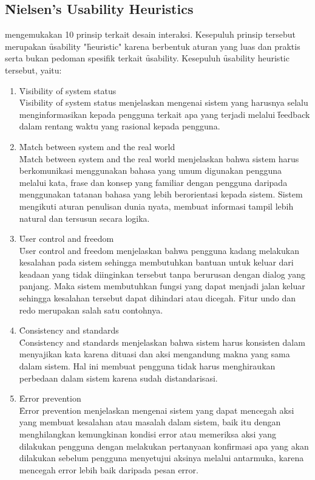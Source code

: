 \subsection{\f{Nielsen's Usability Heuristics}}\label{subsec:nush}
\citet{article.nielsen} mengemukakan 10 prinsip terkait desain interaksi. Kesepuluh prinsip tersebut merupakan \f{usability} "\f{heuristic}" karena berbentuk aturan yang luas dan praktis serta bukan pedoman spesifik terkait \f{usability}. Kesepuluh \f{usability} heuristic tersebut, yaitu:
\begin{enumerate}
	\item \f{Visibility of system status}\\
	\f{Visibility of system status} menjelaskan mengenai sistem yang harusnya selalu menginformasikan kepada pengguna terkait apa yang terjadi melalui \f{feedback} dalam rentang waktu yang rasional kepada pengguna.
	\item \f{Match between system and the real world}\\
	\f{Match between system and the real world} menjelaskan bahwa sistem harus berkomunikasi menggunakan bahasa yang umum digunakan pengguna melalui kata, frase dan konsep yang familiar dengan pengguna daripada menggunakan tatanan bahasa yang lebih berorientasi kepada sistem. Sistem mengikuti aturan penulisan dunia nyata, membuat informasi tampil lebih natural dan tersusun secara logika.
	\item \f{User control and freedom}\\
	\f{User control and freedom} menjelaskan bahwa pengguna kadang melakukan kesalahan pada sistem sehingga membutuhkan bantuan untuk keluar dari keadaan yang tidak diinginkan tersebut tanpa berurusan dengan dialog yang panjang. Maka sistem membutuhkan fungsi yang dapat menjadi jalan keluar sehingga kesalahan tersebut dapat dihindari atau dicegah. Fitur undo dan redo merupakan salah satu contohnya.
	\item \f{Consistency and standards}\\
	\f{Consistency and standards} menjelaskan bahwa sistem harus konsisten dalam menyajikan kata karena dituasi dan aksi mengandung makna yang sama dalam sistem. Hal ini membuat pengguna tidak harus menghiraukan perbedaan dalam sistem karena sudah distandarisasi.
	\item \f{Error prevention}\\
	\f{Error prevention} menjelaskan mengenai sistem yang dapat mencegah aksi yang membuat kesalahan atau masalah dalam sistem, baik itu dengan menghilangkan kemungkinan kondisi error atau memeriksa aksi yang dilakukan pengguna dengan melakukan pertanyaan konfirmasi apa yang akan dilakukan sebelum pengguna menyetujui aksinya melalui antarmuka, karena mencegah error lebih baik daripada pesan error.

\end{enumerate}
